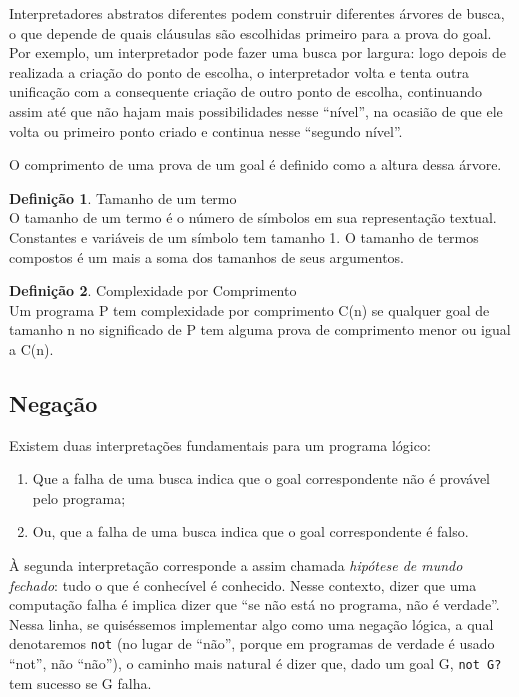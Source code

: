 \documentclass{article}
\theoremstyle{definition}
\newtheorem{definition}{Definição}[section]
\theoremstyle{remark}
\begin{document}
Interpretadores abstratos diferentes podem construir diferentes árvores de busca, o que depende de quais cláusulas são escolhidas primeiro para a prova do goal. Por exemplo, um interpretador pode fazer uma busca por largura: logo depois de realizada a criação do ponto de escolha, o interpretador volta e tenta outra unificação com a consequente criação de outro ponto de escolha, continuando assim até que não hajam mais possibilidades nesse ``nível'', na ocasião de que ele
volta ou primeiro ponto criado e continua nesse ``segundo nível''.

O comprimento de uma prova de um goal é definido como a altura dessa árvore.

\begin{definition}{Tamanho de um termo}
  \\ O tamanho de um termo é o número de símbolos em sua representação textual. Constantes e variáveis de um símbolo tem tamanho 1. O tamanho de termos compostos é um mais a soma dos tamanhos de seus argumentos.
\end{definition}

\begin{definition}{Complexidade por Comprimento}
  \\ Um programa P tem complexidade por comprimento C(n) se qualquer goal de tamanho n no significado de P tem alguma prova de comprimento menor ou igual a C(n).
\end{definition}

\subsection{Negação}

Existem duas interpretações fundamentais para um programa lógico:
\begin{enumerate}
  \item Que a falha de uma busca indica que o goal correspondente não é provável pelo programa;
  \item Ou, que a falha de uma busca indica que o goal correspondente é falso.
\end{enumerate}

    À segunda interpretação corresponde a assim chamada \textit{hipótese de mundo fechado}: tudo o que é conhecível é conhecido. Nesse contexto, dizer que uma computação falha é implica dizer que ``se não está no programa, não é verdade''. Nessa linha, se quiséssemos implementar algo como uma negação lógica, a qual denotaremos {\tt not} (no lugar de ``não'', porque em programas de verdade é usado ``not'', não ``não''), o caminho mais natural é dizer que, dado um goal G, {\tt not G?} tem sucesso se G falha.
\end{document}
